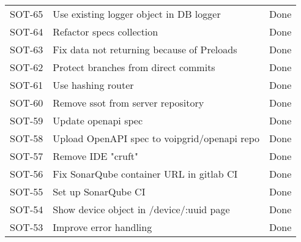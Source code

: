 \documentclass[dutch]{article}
\begin{document}
\begin{longtable}{@{}lp{6cm}l@{}}
    SOT-65             & Use existing logger object in DB logger                                                                                   & Done            \\
    SOT-64             & Refactor specs collection                                                                                                 & Done            \\
    SOT-63             & Fix data not returning because of Preloads                                                                                & Done            \\
    SOT-62             & Protect branches from direct commits                                                                                      & Done            \\
    SOT-61             & Use hashing router                                                                                                        & Done            \\
    SOT-60             & Remove ssot from server repository                                                                                        & Done            \\
    SOT-59             & Update openapi spec                                                                                                       & Done            \\
    SOT-58             & Upload OpenAPI spec to voipgrid/openapi repo                                                                              & Done            \\
    SOT-57             & Remove IDE "cruft"                                                                                                        & Done            \\
    SOT-56             & Fix SonarQube container URL in gitlab CI                                                                                  & Done            \\
    SOT-55             & Set up SonarQube CI                                                                                                       & Done            \\
    SOT-54             & Show device object in /device/:uuid page                                                                                  & Done            \\
    SOT-53             & Improve error handling                                                                                                    & Done            \\

\end{longtable}
\end{document}
